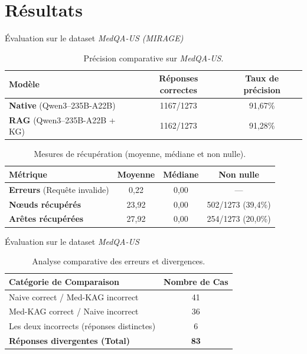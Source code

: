 \section{Résultats}

\begin{frame}{Évaluation sur le dataset \emph{MedQA-US
  (MIRAGE)}~\cite{xiong2024benchmarkingretrievalaugmentedgenerationmedicine}}
  \begin{table}
    \centering
    \begin{tabular}{lcc}
      \toprule
      \textbf{Modèle} & \textbf{Réponses correctes} & \textbf{Taux
      de précision} \\
      \midrule
      \textbf{Native} (Qwen3--235B-A22B) & 1167/1273 & 91,67\% \\
      \textbf{RAG} (Qwen3--235B-A22B + KG) & 1162/1273 & 91,28\% \\
      \bottomrule
    \end{tabular}
    \caption{Précision comparative sur \emph{MedQA-US}.}
  \end{table}

  \pause[]

  \begin{table}
    \centering
    \begin{tabular}{lccc}
      \toprule
      \textbf{Métrique} & \textbf{Moyenne} & \textbf{Médiane} &
      \textbf{Non nulle} \\
      \midrule
      \textbf{Erreurs} (Requête invalide) & 0,22 & 0,00 & --- \\
      \textbf{N\oe{}uds récupérés} & 23,92 & 0,00 & 502/1273 (39,4\%) \\
      \textbf{Arêtes récupérées} & 27,92 & 0,00 & 254/1273 (20,0\%) \\
      \bottomrule
    \end{tabular}
    \caption{Mesures de récupération (moyenne, médiane et non nulle).}
  \end{table}
\end{frame}

\begin{frame}{Évaluation sur le dataset \emph{MedQA-US}}
  \begin{table}[h]
    \centering
    \begin{tabular}{lc}
      \toprule
      \textbf{Catégorie de Comparaison} & \textbf{Nombre de Cas} \\
      \midrule
      \quad Naive correct / Med-KAG incorrect & 41 \\
      \quad Med-KAG correct / Naive incorrect & 36 \\
      \quad Les deux incorrects (réponses distinctes) & 6 \\
      \textbf{Réponses divergentes (Total)} & \textbf{83} \\
      \bottomrule
    \end{tabular}
    \caption{Analyse comparative des erreurs et divergences.}
  \end{table}
\end{frame}

